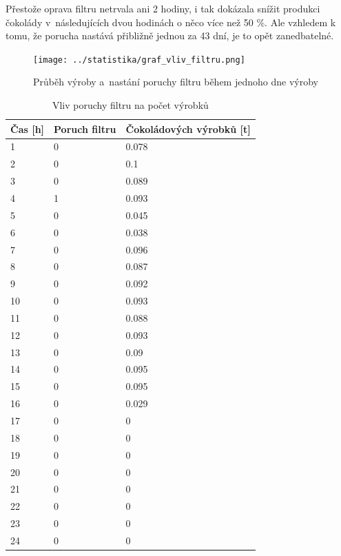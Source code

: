 \documentclass[11pt,a4paper,titlepage]{article}
\begin{document}
				Přestože oprava filtru netrvala ani 2 hodiny, i tak dokázala snížit produkci čokolády
				v~následujících dvou hodinách o něco více než 50 \%. Ale vzhledem k tomu, že
				porucha nastává přibližně jednou za 43 dní, je to opět zanedbatelné.

				\begin{figure}[H]
				\begin{center}
					\texttt{[image: ../statistika/graf\_vliv\_filtru.png]}
					\caption{ Průběh výroby a~nastání poruchy filtru během jednoho dne výroby }
					\label{fig:graf_filtr}
				\end{center}
				\end{figure}

				\begin{table}[H]
				    \centering
				    \begin{tabular}{|l|l|l|}
					    \hline
					    Čas [h] &  Poruch filtru &  Čokoládových výrobků [t] \\ \hline
					    1 &  0 &  0.078 \\
					    2 &  0 &  0.1 \\
					    3 &  0 &  0.089 \\
					    4 &  1 &  0.093 \\
					    5 &  0 &  0.045 \\
					    6 &  0 &  0.038 \\
					    7 &  0 &  0.096 \\
					    8 &  0 &  0.087 \\
					    9 &  0 &  0.092 \\
					    10 &  0 &  0.093 \\
					    11 &  0 &  0.088 \\
					    12 &  0 &  0.093 \\
					    13 &  0 &  0.09 \\
					    14 &  0 &  0.095 \\
					    15 &  0 &  0.095 \\
					    16 &  0 &  0.029 \\
					    17 &  0 &  0 \\
					    18 &  0 &  0 \\
					    19 &  0 &  0 \\
					    20 &  0 &  0 \\
					    21 &  0 &  0 \\
					    22 &  0 &  0 \\
					    23 &  0 &  0 \\
					    24 &  0 &  0 \\ \hline
				\end{tabular}
				\caption{Vliv poruchy filtru na počet výrobků}
				\label{table:experiment_filtr}
			\end{table}
\end{document}

